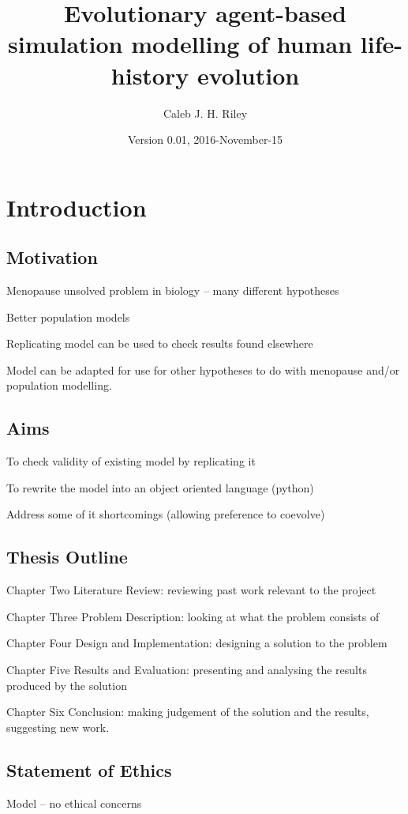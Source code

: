 \documentclass[authoryearcitations]{UoYCSproject}
\author{Caleb J. H. Riley}
\title{Evolutionary agent-based simulation modelling of human life-history evolution}
\date{Version 0.01, 2016-November-15}
\begin{document}
\maketitle
\listoffigures
\listoftables

\cleardoublepage

\chapter{Introduction}
\label{cha:Introduction}
\section{Motivation}
Menopause unsolved problem in biology -- many different hypotheses

Better population models

Replicating model can be used to check results found elsewhere

Model can be adapted for use for other hypotheses to do with menopause and/or population modelling.

\section{Aims}
To check validity of existing model by replicating it

To rewrite the model into an object oriented language (python)

Address some of it shortcomings (allowing preference to coevolve)

\section{Thesis Outline}
Chapter Two Literature Review: reviewing past work relevant to the project

Chapter Three Problem Description: looking at what the problem consists of

Chapter Four Design and Implementation: designing a solution to the problem

Chapter Five Results and Evaluation: presenting and analysing the results produced by the solution

Chapter Six Conclusion: making judgement of the solution and the results, suggesting new work.

\section{Statement of Ethics}
Model -- no ethical concerns
\end{document}
